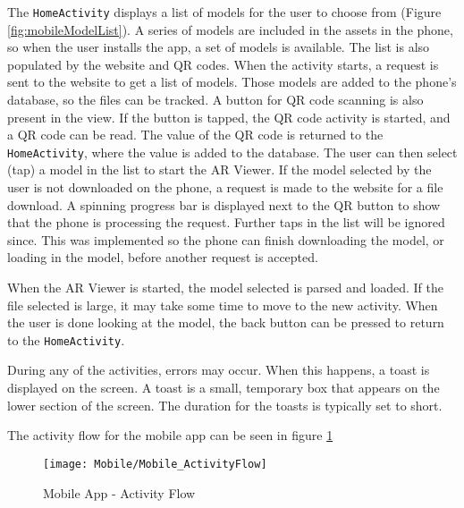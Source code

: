             The \texttt{HomeActivity} displays a list of models for the user to choose from (Figure \ref{fig:mobileModelList}).  A series of models are included in the assets in the phone, so when the user installs the app, a set of models is available.  The list is also populated by the website and QR codes.  When the activity starts, a request is sent to the website to get a list of models.  Those models are added to the phone's database, so the files can be tracked.  A button for QR code scanning is also present in the view.  If the button is tapped, the QR code activity is started, and a QR code can be read.  The value of the QR code is returned to the \texttt{HomeActivity}, where the value is added to the database.  The user can then select (tap) a model in the list to start the AR Viewer.  If the model selected by the user is not downloaded on the phone, a request is made to the website for a file download.  A spinning progress bar is displayed next to the QR button to show that the phone is processing the request.  Further taps in the list will be ignored since.  This was implemented so the phone can finish downloading the model, or loading in the model, before another request is accepted.

            When the AR Viewer is started, the model selected is parsed and loaded.  If the file selected is large, it may take some time to move to the new activity.  When the user is done looking at the model, the back button can be pressed to return to the \texttt{HomeActivity}.
            
            During any of the activities, errors may occur.  When this happens, a toast is displayed on the screen.  A toast is a small, temporary box that appears on the lower section of the screen.  The duration for the toasts is typically set to short. 

            The activity flow for the mobile app can be seen in figure \ref{fig:mobileActivityFlow}

            \begin{figure}[H]
                \texttt{[image: Mobile/Mobile\_ActivityFlow]}
                \centering
                \caption{Mobile App - Activity Flow}
                \label{fig:mobileActivityFlow}
            \end{figure}

